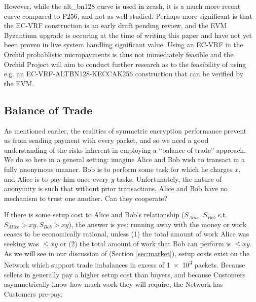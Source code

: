 However, while the alt\_bn128 curve is used in zcash, it is a much more recent curve compared to P256, and not as well studied. Perhaps more significant is that the EC-VRF construction is an early draft pending review, and the EVM Byzantium upgrade is occuring at the time of writing this paper and have not yet been proven in live system handling significant value. Using an EC-VRF in the Orchid probablistic micropayments is thus not immediately feasible and the Orchid Project will aim to conduct further research as to the feasibility of using e.g. an EC-VRF-ALTBN128-KECCAK256 construction that can be verified by the EVM.

\subsection{Balance of Trade}
\label{tokens-bot}

As mentioned earlier, the realities of symmetric encryption performance prevent us from sending payment with every packet, and so we need a good understanding of the risks inherent in employing a ``balance of trade'' approach. We do so here in a general setting: imagine Alice and Bob wish to transact in a fully anonymous manner. Bob is to perform some task for which he charges $x$, and Alice is to pay him once every $y$ tasks. Unfortunately, the nature of anonymity is such that without prior transactions, Alice and Bob have no mechanism to trust one another. Can they cooperate?

If there is some setup cost to Alice and Bob's relationship ($S_{Alice}, S_{Bob}$ s.t. $S_{Alice} > xy, S_{Bob} > xy$), the answer is yes: running away with the money or work ceases to be economically rational, unless (1) the total amount of work Alice was seeking was $\leq xy$ or (2) the total amount of work that Bob can perform is $\leq xy$. As we will see in our discussion of \tOM{} (Section \ref{sec:market}), setup costs exist on the \Orchid{} Network which support trade imbalances in excess of \num{1e3} packets. Because sellers in \tOM{} generally pay a higher setup cost than buyers, and because Customers asymmetrically know how much work they will require, the \Orchid{} Network has Customers pre-pay.




